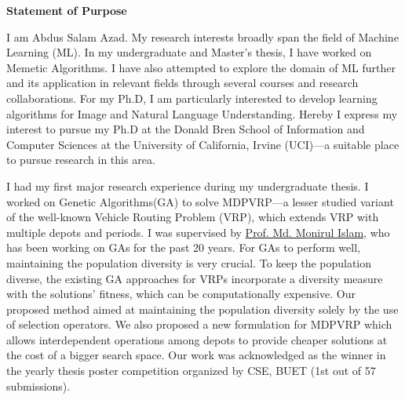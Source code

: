 \documentclass[12pt]{article}
\begin{document}


\fancyhf{}
\rfoot{\thepage}

\begin{center}
{\LARGE \bf 
Statement of Purpose}\\
\end{center}



I am Abdus Salam Azad. My research interests broadly span the field of Machine Learning (ML). In my undergraduate and Master's thesis, I have worked on Memetic Algorithms. I have also attempted to explore the domain of ML further and its application in relevant fields through several courses and research collaborations. For my Ph.D, I am particularly interested to develop learning algorithms for Image and Natural Language Understanding. Hereby I express my interest to pursue my Ph.D at the Donald Bren School of Information and Computer Sciences at the University of California, Irvine (UCI)---a suitable place to pursue research in this area. 

I had my first major research experience during my undergraduate thesis. I worked on Genetic Algorithms(GA) to solve MDPVRP---a lesser studied variant of the well-known Vehicle Routing Problem (VRP), which extends VRP with multiple depots and periods. I was supervised by \href{http://cse.buet.ac.bd/faculty/facdetail.php?id=mdmonirulislam}{Prof. Md. Monirul Islam}, who has been working on GAs for the past 20 years. For GAs to perform well, maintaining the population diversity is very crucial. To keep the population diverse, the existing GA approaches for VRPs incorporate a diversity measure with the solutions' fitness, which can be computationally expensive. Our proposed method aimed at maintaining the population diversity solely by the use of selection operators. We also proposed a new formulation for MDPVRP which allows interdependent operations among depots to provide cheaper solutions at the cost of a bigger search space. Our work was acknowledged as the winner in the yearly thesis poster competition organized by CSE, BUET (1st out of 57 submissions).
\end{document}
